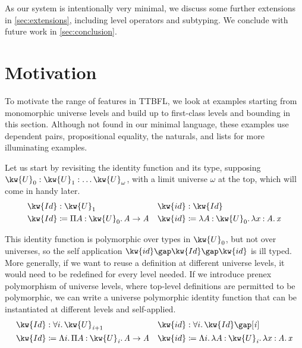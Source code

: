 \documentclass[a4paper,UKenglish,cleveref,autoref,thm-restate]{lipics-v2021}
\makeatletter
\newcommand{\lang}{TTBFL\@\xspace}
\makeatother
\begin{document}
As our system is intentionally very minimal,
we discuss some further extensions in \cref{sec:extensions},
including level operators and subtyping.
We conclude with future work in \cref{sec:conclusion}.

\section{Motivation}

To motivate the range of features in \lang,
we look at examples starting from monomorphic universe levels
and build up to first-class levels and bounding in this section.
Although not found in our minimal language,
these examples use dependent pairs, propositional equality, the naturals, and lists
for more illuminating examples.

Let us start by revisiting the identity function and its type,
supposing $ \kw{U}_{  0  }  :  \kw{U}_{  1  }  : \dots  \kw{U}_{  \omega  } $,
with a limit universe $ \omega $ at the top,
which will come in handy later.
%
\begin{align*}
   \kw{ Id }  &:  \kw{U}_{  1  } 
  & \kw{ id }  &:  \kw{ Id }  \\
   \kw{ Id }  &\coloneqq   \Pi  A  \mathbin{:}   \kw{U}_{  0  }   \mathpunct{.}   \mathit{ A }    \to   \mathit{ A }  
  &  \kw{ id }  &\coloneqq  \lambda  A  \mathbin{:}   \kw{U}_{  0  }   \mathpunct{.}   \lambda  x  \mathbin{:}   \mathit{ A }   \mathpunct{.}   \mathit{ x }   
\end{align*}

This identity function is polymorphic over types in $ \kw{U}_{  0  } $,
but not over universes, so the self application
$   \kw{ id }   \gap   \kw{ Id }    \gap   \kw{ id }  $ is ill typed.
More generally, if we want to reuse a definition at different universe levels,
it would need to be redefined for every level needed.
If we introduce prenex polymorphism of universe levels,
where top-level definitions are permitted to be polymorphic,
we can write a universe polymorphic identity function
that can be instantiated at different levels and self-applied.
%
\begin{align*}
   \kw{ Id }  &:  \forall  i  \mathpunct{.}   \kw{U}_{    \mathit{ i }   + 1   }  
  & \kw{ id }  &:   \forall  i  \mathpunct{.}   \kw{ Id }    \gap [   \mathit{ i }   ]  \\
   \kw{ Id }  &\coloneqq   \Lambda  i  \mathpunct{.}   \Pi  A  \mathbin{:}   \kw{U}_{  \mathit{ i }  }   \mathpunct{.}   \mathit{ A }     \to   \mathit{ A }  
  & \kw{ id }  &\coloneqq  \Lambda  i  \mathpunct{.}   \lambda  A  \mathbin{:}   \kw{U}_{  \mathit{ i }  }   \mathpunct{.}   \lambda  x  \mathbin{:}   \mathit{ A }   \mathpunct{.}   \mathit{ x }    
\end{align*}
\end{document}
